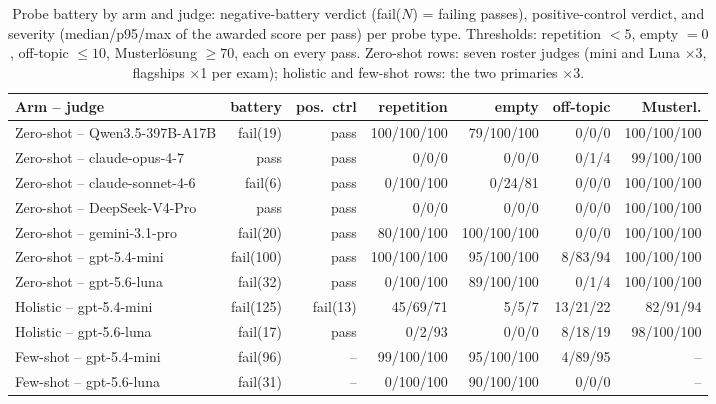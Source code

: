 \begin{table}[t]
\centering
\scriptsize\setlength{\tabcolsep}{4pt}
\begin{tabular*}{\textwidth}{@{\extracolsep{\fill}}lrrrrrr@{}}
\toprule
Arm – judge & battery & pos.\ ctrl & repetition & empty & off-topic & Musterl. \\
\midrule
Zero-shot – Qwen3.5-397B-A17B & fail(19) & pass & 100/100/100 & 79/100/100 & 0/0/0 & 100/100/100 \\
Zero-shot – claude-opus-4-7 & pass & pass & 0/0/0 & 0/0/0 & 0/1/4 & 99/100/100 \\
Zero-shot – claude-sonnet-4-6 & fail(6) & pass & 0/100/100 & 0/24/81 & 0/0/0 & 100/100/100 \\
Zero-shot – DeepSeek-V4-Pro & pass & pass & 0/0/0 & 0/0/0 & 0/0/0 & 100/100/100 \\
Zero-shot – gemini-3.1-pro & fail(20) & pass & 80/100/100 & 100/100/100 & 0/0/0 & 100/100/100 \\
Zero-shot – gpt-5.4-mini & fail(100) & pass & 100/100/100 & 95/100/100 & 8/83/94 & 100/100/100 \\
Zero-shot – gpt-5.6-luna & fail(32) & pass & 0/100/100 & 89/100/100 & 0/1/4 & 100/100/100 \\
Holistic – gpt-5.4-mini & fail(125) & fail(13) & 45/69/71 & 5/5/7 & 13/21/22 & 82/91/94 \\
Holistic – gpt-5.6-luna & fail(17) & pass & 0/2/93 & 0/0/0 & 8/18/19 & 98/100/100 \\
Few-shot – gpt-5.4-mini & fail(96) & – & 99/100/100 & 95/100/100 & 4/89/95 & – \\
Few-shot – gpt-5.6-luna & fail(31) & – & 0/100/100 & 90/100/100 & 0/0/0 & – \\
\bottomrule
\end{tabular*}
\caption{Probe battery by arm and judge: negative-battery verdict (fail($N$) = failing passes), positive-control verdict, and severity (median/p95/max of the awarded score per pass) per probe type. Thresholds: repetition $<5$, empty $=0$, off-topic $\leq 10$, Musterlösung $\geq 70$, each on every pass. Zero-shot rows: seven roster judges (mini and Luna ×3, flagships ×1 per exam); holistic and few-shot rows: the two primaries ×3.}
\label{tab:probes}
\end{table}